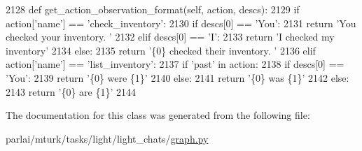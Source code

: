 \begin{DoxyCode}
2128     \textcolor{keyword}{def }get\_action\_observation\_format(self, action, descs):
2129         \textcolor{keywordflow}{if} action[\textcolor{stringliteral}{'name'}] == \textcolor{stringliteral}{'check\_inventory'}:
2130             \textcolor{keywordflow}{if} descs[0] == \textcolor{stringliteral}{'You'}:
2131                 \textcolor{keywordflow}{return} \textcolor{stringliteral}{'You checked your inventory. '}
2132             \textcolor{keywordflow}{elif} descs[0] == \textcolor{stringliteral}{'I'}:
2133                 \textcolor{keywordflow}{return} \textcolor{stringliteral}{'I checked my inventory'}
2134             \textcolor{keywordflow}{else}:
2135                 \textcolor{keywordflow}{return} \textcolor{stringliteral}{'\{0\} checked their inventory. '}
2136         \textcolor{keywordflow}{elif} action[\textcolor{stringliteral}{'name'}] == \textcolor{stringliteral}{'list\_inventory'}:
2137             \textcolor{keywordflow}{if} \textcolor{stringliteral}{'past'} \textcolor{keywordflow}{in} action:
2138                 \textcolor{keywordflow}{if} descs[0] == \textcolor{stringliteral}{'You'}:
2139                     \textcolor{keywordflow}{return} \textcolor{stringliteral}{'\{0\} were \{1\}'}
2140                 \textcolor{keywordflow}{else}:
2141                     \textcolor{keywordflow}{return} \textcolor{stringliteral}{'\{0\} was \{1\}'}
2142             \textcolor{keywordflow}{else}:
2143                 \textcolor{keywordflow}{return} \textcolor{stringliteral}{'\{0\} are \{1\}'}
2144 
\end{DoxyCode}


The documentation for this class was generated from the following file\+:\begin{DoxyCompactItemize}
\item 
parlai/mturk/tasks/light/light\+\_\+chats/\hyperlink{parlai_2mturk_2tasks_2light_2light__chats_2graph_8py}{graph.\+py}\end{DoxyCompactItemize}
